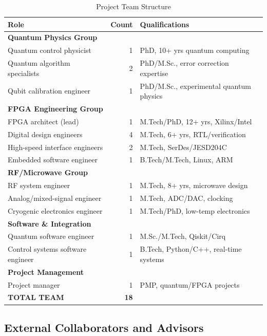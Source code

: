 \documentclass[12pt,a4paper]{article}
\begin{document}
\begin{enumerate}[leftmargin=*]
\begin{table}[H]
\centering
\caption{Project Team Structure}
\begin{tabular}{@{}lrl@{}}
\toprule
\textbf{Role} & \textbf{Count} & \textbf{Qualifications} \\
\midrule
\textbf{Quantum Physics Group} & & \\
Quantum control physicist & 1 & PhD, 10+ yrs quantum computing \\
Quantum algorithm specialists & 2 & PhD/M.Sc., error correction expertise \\
Qubit calibration engineer & 1 & PhD/M.Sc., experimental quantum physics \\
\midrule
\textbf{FPGA Engineering Group} & & \\
FPGA architect (lead) & 1 & M.Tech/PhD, 12+ yrs, Xilinx/Intel \\
Digital design engineers & 4 & M.Tech, 6+ yrs, RTL/verification \\
High-speed interface engineers & 2 & M.Tech, SerDes/JESD204C \\
Embedded software engineer & 1 & B.Tech/M.Tech, Linux, ARM \\
\midrule
\textbf{RF/Microwave Group} & & \\
RF system engineer & 1 & M.Tech, 8+ yrs, microwave design \\
Analog/mixed-signal engineer & 1 & M.Tech, ADC/DAC, clocking \\
Cryogenic electronics engineer & 1 & M.Tech/PhD, low-temp electronics \\
\midrule
\textbf{Software \& Integration} & & \\
Quantum software engineer & 1 & M.Sc./M.Tech, Qiskit/Cirq \\
Control systems software engineer & 1 & B.Tech, Python/C++, real-time systems \\
\midrule
\textbf{Project Management} & & \\
Project manager & 1 & PMP, quantum/FPGA projects \\
\midrule
\textbf{TOTAL TEAM} & \textbf{18} & \\
\bottomrule
\end{tabular}
\end{table}

\subsection{External Collaborators and Advisors}


\end{enumerate}
\end{document}
